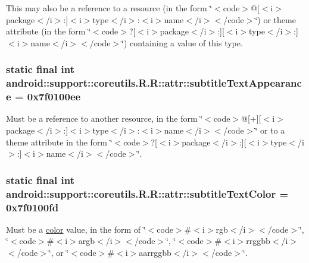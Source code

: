 This may also be a reference to a resource (in the form \char`\"{}$<$code$>$@\mbox{[}$<$i$>$package$<$/i$>$:\mbox{]}$<$i$>$type$<$/i$>$:$<$i$>$name$<$/i$>$$<$/code$>$\char`\"{}) or theme attribute (in the form \char`\"{}$<$code$>$?\mbox{[}$<$i$>$package$<$/i$>$:\mbox{]}\mbox{[}$<$i$>$type$<$/i$>$:\mbox{]}$<$i$>$name$<$/i$>$$<$/code$>$\char`\"{}) containing a value of this type. \hypertarget{classandroid_1_1support_1_1coreutils_1_1_r_1_1attr_106d8ce543af3a3e78981ff67cc41a65}{
\subsubsection[{subtitleTextAppearance}]{\setlength{\rightskip}{0pt plus 5cm}static final int android::support::coreutils.R.R::attr::subtitleTextAppearance = 0x7f0100ee}}
\label{classandroid_1_1support_1_1coreutils_1_1_r_1_1attr_106d8ce543af3a3e78981ff67cc41a65}


Must be a reference to another resource, in the form \char`\"{}$<$code$>$@\mbox{[}+\mbox{]}\mbox{[}$<$i$>$package$<$/i$>$:\mbox{]}$<$i$>$type$<$/i$>$:$<$i$>$name$<$/i$>$$<$/code$>$\char`\"{} or to a theme attribute in the form \char`\"{}$<$code$>$?\mbox{[}$<$i$>$package$<$/i$>$:\mbox{]}\mbox{[}$<$i$>$type$<$/i$>$:\mbox{]}$<$i$>$name$<$/i$>$$<$/code$>$\char`\"{}. \hypertarget{classandroid_1_1support_1_1coreutils_1_1_r_1_1attr_5946f88f8f119ddae6c8bdcd06bbb4c2}{
\subsubsection[{subtitleTextColor}]{\setlength{\rightskip}{0pt plus 5cm}static final int android::support::coreutils.R.R::attr::subtitleTextColor = 0x7f0100fd}}
\label{classandroid_1_1support_1_1coreutils_1_1_r_1_1attr_5946f88f8f119ddae6c8bdcd06bbb4c2}


Must be a \hyperlink{classandroid_1_1support_1_1coreutils_1_1_r_1_1color}{color} value, in the form of \char`\"{}$<$code$>$\#$<$i$>$rgb$<$/i$>$$<$/code$>$\char`\"{}, \char`\"{}$<$code$>$\#$<$i$>$argb$<$/i$>$$<$/code$>$\char`\"{}, \char`\"{}$<$code$>$\#$<$i$>$rrggbb$<$/i$>$$<$/code$>$\char`\"{}, or \char`\"{}$<$code$>$\#$<$i$>$aarrggbb$<$/i$>$$<$/code$>$\char`\"{}. 

